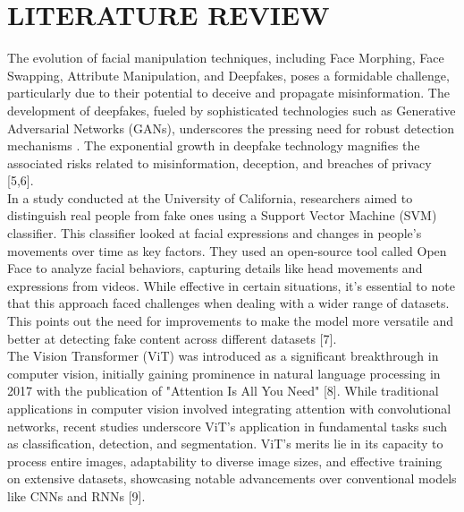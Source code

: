 \section{LITERATURE REVIEW}

The evolution of facial manipulation techniques, including Face Morphing, Face Swapping, Attribute Manipulation, and Deepfakes, poses a formidable challenge, particularly due to their potential to deceive and propagate misinformation. The development of deepfakes, fueled by sophisticated technologies such as Generative Adversarial Networks (GANs), underscores the pressing need for robust detection mechanisms . The exponential growth in deepfake technology magnifies the associated risks related to misinformation, deception, and breaches of privacy [5,6].\\

In a study conducted at the University of California, researchers aimed to distinguish real people from fake ones using a Support Vector Machine (SVM) classifier. This classifier looked at facial expressions and changes in people's movements over time as key factors. They used an open-source tool called Open Face to analyze facial behaviors, capturing details like head movements and expressions from videos. While effective in certain situations, it's essential to note that this approach faced challenges when dealing with a wider range of datasets. This points out the need for improvements to make the model more versatile and better at detecting fake content across different datasets [7].\\

The Vision Transformer (ViT) was introduced as a significant breakthrough in computer vision, initially gaining prominence in natural language processing in 2017 with the publication of "Attention Is All You Need" [8]. While traditional applications in computer vision involved integrating attention with convolutional networks, recent studies underscore ViT's application in fundamental tasks such as classification, detection, and segmentation. ViT's merits lie in its capacity to process entire images, adaptability to diverse image sizes, and effective training on extensive datasets, showcasing notable advancements over conventional models like CNNs and RNNs [9].\\

